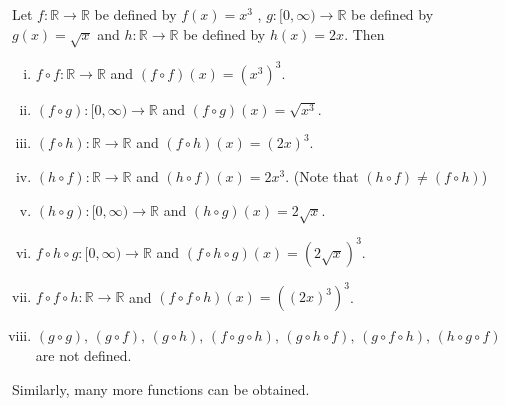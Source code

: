 \documentclass[a4paper,english,12pt]{article}
\begin{document}
\begin{exmp}
Let $f:\mathbb{R}\rightarrow \mathbb{R}$ be defined by $f(x)=x^3$ , $g:[0,\infty)\rightarrow \mathbb{R}$ be defined by $g(x)=\sqrt{x}$ and $h:\mathbb{R}\rightarrow \mathbb{R}$ be defined by $h(x)=2x$. Then 
\begin{enumerate}[i)]
\item $f\circ f:\mathbb{R}\rightarrow \mathbb{R}$ and $(f\circ f)(x)=(x^3)^3$.
\item $(f\circ g):[0,\infty)\rightarrow \mathbb{R}$ and $(f\circ g)(x)=\sqrt{x^3}$.
\item $(f\circ h):\mathbb{R}\rightarrow \mathbb{R}$ and $(f\circ h)(x)=(2x)^3$.
\item $(h\circ f):\mathbb{R}\rightarrow \mathbb{R}$ and $(h\circ f)(x)=2x^3$. (Note that $(h\circ f)\neq (f\circ h)$)
\item $(h\circ g):[0,\infty)\rightarrow \mathbb{R}$ and $(h\circ g)(x)=2\sqrt{x}$.
\item $f\circ h\circ g:[0,\infty)\rightarrow \mathbb{R}$ and $(f\circ h\circ g)(x)=(2\sqrt{x})^3$.
\item $f\circ f\circ h:\mathbb{R}\rightarrow \mathbb{R}$ and $(f\circ f\circ h)(x)=((2x)^3)^3$.
\item $(g\circ g),\,(g\circ f),\,(g\circ h),\,(f\circ g\circ h),\,(g\circ h\circ f),\,(g\circ f\circ h),\,(h\circ g\circ f)$ are not defined.
\end{enumerate}
Similarly, many more functions can be obtained.
\label{ex_comp}
\end{exmp}
\end{document}
